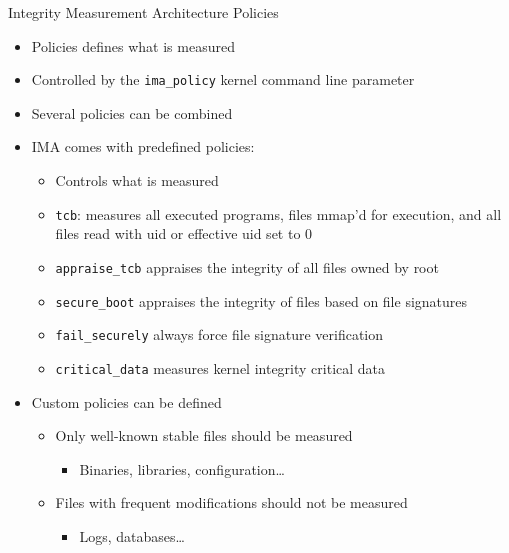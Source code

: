 \begin{frame}{Integrity Measurement Architecture Policies}
  \begin{itemize}
    \item Policies defines what is measured
    \item Controlled by the \texttt{ima\_policy} kernel command line parameter
    \item Several policies can be combined
    \item IMA comes with predefined policies:
      \begin{itemize}
        \item Controls what is measured
        \item \texttt{tcb}: measures all executed programs, files mmap'd for
          execution, and all files read with uid or effective uid set to 0
        \item \texttt{appraise\_tcb} appraises the integrity of all files owned by root
        \item \texttt{secure\_boot} appraises the integrity of files based on file signatures
        \item \texttt{fail\_securely} always force file signature verification
        \item \texttt{critical\_data} measures kernel integrity critical data
      \end{itemize}
    \item Custom policies can be defined
      \begin{itemize}
        \item Only well-known stable files should be measured
          \begin{itemize}
            \item Binaries, libraries, configuration\ldots
          \end{itemize}
        \item Files with frequent modifications should not be measured
          \begin{itemize}
            \item Logs, databases\ldots
          \end{itemize}
      \end{itemize}
  \end{itemize}
\end{frame}

